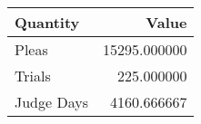 \begin{tabular}{lr}
\toprule
  Quantity &        Value \\
\midrule
     Pleas & 15295.000000 \\
    Trials &   225.000000 \\
Judge Days &  4160.666667 \\
\bottomrule
\end{tabular}
